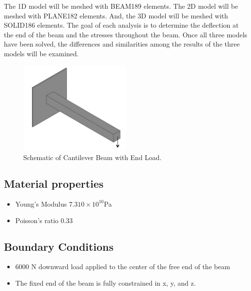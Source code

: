 \documentclass[letterpaper,pdftex]{article}
\begin{document}
The 1D model will be meshed with BEAM189 elements. The 2D model will be meshed with PLANE182 elements. And, the 3D model will be meshed with SOLID186 elements. The goal of each analysis is to determine the deflection at the end of the beam and the stresses throughout the beam. Once all three models have been solved, the differences and similarities among the results of the three models will be examined.

\begin{figure}[h]
   \centering
   \includegraphics[width=0.5\textwidth]{problem}
   \caption{Schematic of Cantilever Beam with End Load.}
   \label{fig:problem}
\end{figure}

\subsection{Material properties}
\begin{itemize}
\item Young's Modulus $7.310\times10^{10}$Pa
\item Poisson's ratio $0.33$
\end{itemize}
\subsection{Boundary Conditions}
\begin{itemize}
\item $6000$ N downward load applied to the center of the free end of the beam
\item The fixed end of the beam is fully constrained in x, y, and z.
\end{itemize}
\end{document}
